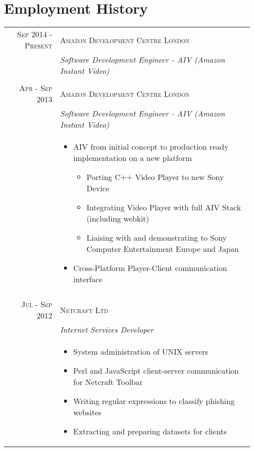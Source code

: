 \section*{Employment History}

\begin{tabular}{r|p{11cm}}

\textsc{Sep 2014 - Present} & \textsc{Amazon Development Centre London}\\ 
& \emph{Software Development Engineer - AIV (Amazon Instant Video)}\\

\multicolumn{2}{c}{} \\

\textsc{Apr - Sep 2013} & \textsc{Amazon Development Centre London}\\ 
& \emph{Software Development Engineer - AIV (Amazon Instant Video)}\\
& \begin{footnotesize}
\begin{itemize}
	\vspace*{-\baselineskip}
	\item AIV from initial concept to production ready implementation on a new platform
		\begin{itemize}
		\item Porting C++ Video Player to new Sony Device
		\item Integrating Video Player with full AIV Stack (including webkit)
		\item Liaising with and demonstrating to Sony Computer Entertainment Europe and Japan
		\end{itemize}
	\item Cross-Platform Player-Client communication interface
	\vspace*{-\baselineskip}
\end{itemize}
\end{footnotesize}\\

\multicolumn{2}{c}{} \\


\textsc{Jul - Sep 2012} & \textsc{Netcraft Ltd}\\ 
& \emph{Internet Services Developer}\\
& \begin{footnotesize}
\begin{itemize}
	\vspace*{-\baselineskip}
	\item System administration of UNIX servers
	\item Perl and JavaScript client-server communication for Netcraft Toolbar
	\item Writing regular expressions to classify phishing websites
	\item Extracting and preparing datasets for clients
	\vspace*{-\baselineskip}
\end{itemize}
\end{footnotesize}\\


\end{tabular}
